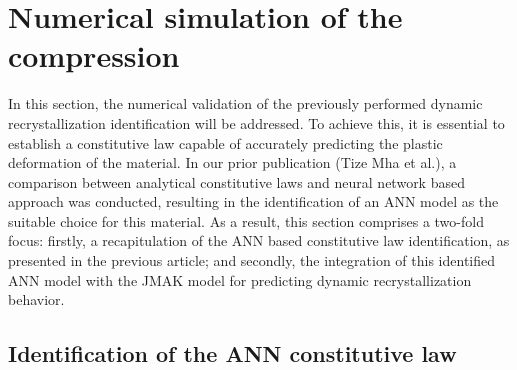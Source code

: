 \documentclass[metals,article,submit,pdftex,moreauthors]{Definitions/mdpi}
\makeatletter
\DeclareRobustCommand{\eal}{et al.\@\xspace}
\makeatother
\begin{document}
\section{Numerical simulation of the compression\label{sec:NumSim}}

In this section, the numerical validation of the previously performed dynamic recrystallization identification will be addressed.
To achieve this, it is essential to establish a constitutive law capable of accurately predicting the plastic deformation of the material.
In our prior publication (Tize Mha \eal \cite{TizeMha-2023}), a comparison between analytical constitutive laws and neural network based approach was conducted, resulting in the identification of an ANN model as the suitable choice for this material.
As a result, this section comprises a two-fold focus: firstly, a recapitulation of the ANN based constitutive law identification, as presented in the previous article; and secondly, the integration of this identified ANN model with the JMAK model for predicting dynamic recrystallization behavior.

\subsection{Identification of the ANN constitutive law\label{subsec:ANNConstitutiveLaw}}
\end{document}
